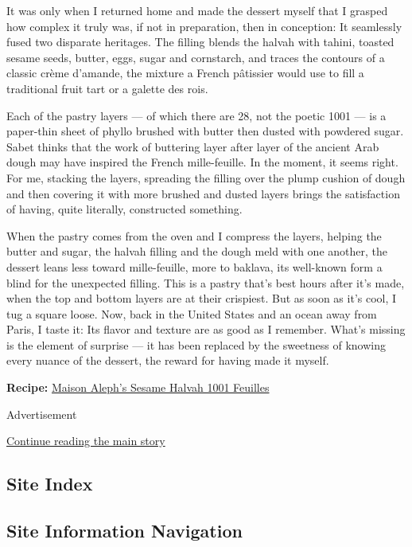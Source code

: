 It was only when I returned home and made the dessert myself that I
grasped how complex it truly was, if not in preparation, then in
conception: It seamlessly fused two disparate heritages. The filling
blends the halvah with tahini, toasted sesame seeds, butter, eggs, sugar
and cornstarch, and traces the contours of a classic crème d'amande, the
mixture a French pâtissier would use to fill a traditional fruit tart or
a galette des rois.

Each of the pastry layers --- of which there are 28, not the poetic 1001
--- is a paper-thin sheet of phyllo brushed with butter then dusted with
powdered sugar. Sabet thinks that the work of buttering layer after
layer of the ancient Arab dough may have inspired the French
mille-feuille. In the moment, it seems right. For me, stacking the
layers, spreading the filling over the plump cushion of dough and then
covering it with more brushed and dusted layers brings the satisfaction
of having, quite literally, constructed something.

When the pastry comes from the oven and I compress the layers, helping
the butter and sugar, the halvah filling and the dough meld with one
another, the dessert leans less toward mille-feuille, more to baklava,
its well-known form a blind for the unexpected filling. This is a pastry
that's best hours after it's made, when the top and bottom layers are at
their crispiest. But as soon as it's cool, I tug a square loose. Now,
back in the United States and an ocean away from Paris, I taste it: Its
flavor and texture are as good as I remember. What's missing is the
element of surprise --- it has been replaced by the sweetness of knowing
every nuance of the dessert, the reward for having made it myself.

\textbf{Recipe:}
\href{https://cooking.nytimes3xbfgragh.onion/recipes/1019257-maison-alephs-sesame-halvah-1001-feuilles}{Maison
Aleph's Sesame Halvah 1001 Feuilles}

Advertisement

\protect\hyperlink{after-bottom}{Continue reading the main story}

\hypertarget{site-index}{%
\subsection{Site Index}\label{site-index}}

\hypertarget{site-information-navigation}{%
\subsection{Site Information
Navigation}\label{site-information-navigation}}

